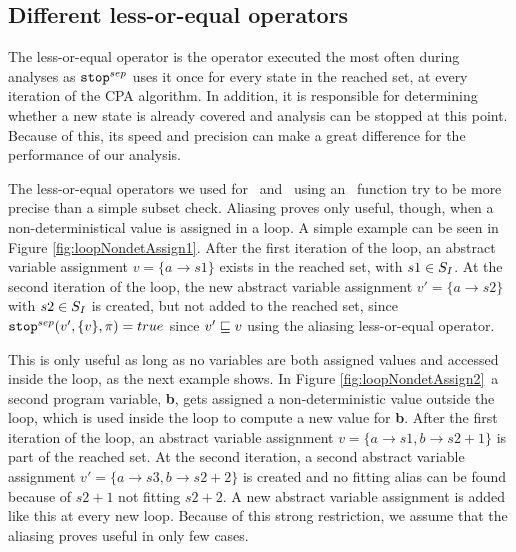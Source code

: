 \subsection{Different less-or-equal operators}
\label{sec:leqOperators}
The less-or-equal operator is the operator executed the most often during analyses as $\texttt{stop}^{sep}$ uses it once for every state in the reached set, at every iteration of the CPA algorithm.
In addition, it is responsible for determining whether a new state is already covered and analysis can be stopped at this point.
Because of this, its speed and precision can make a great difference for the performance of our analysis.

The  less-or-equal operators we used for \symbolicValueAnalysisCPA\ and \constraintsCPA\ using an \aliasFunc\ function try to be more precise than a simple subset check.
Aliasing proves only useful, though, when a non-deterministical value is assigned in a loop. A simple example can be seen in Figure \ref{fig:loopNondetAssign1}.
After the first iteration of the loop, an abstract variable assignment $v = \{ a \rightarrow s1 \}$ exists in the reached set, with $s1 \in S_I$.
At the second iteration of the loop, the new abstract variable assignment $v' = \{ a \rightarrow s2 \}$ with $s2 \in S_I$ is created, but not added to the reached set, since $\texttt{stop}^{sep}(v', \{ v \}, \pi) = true$ since $v' \sqsubseteq v$ using the aliasing less-or-equal operator.

This is only useful as long as no variables are both assigned values and accessed inside the loop, as the next example shows. In Figure \ref{fig:loopNondetAssign2}\ a second program variable, \textbf{b}, gets assigned a non-deterministic value outside the loop, which is used inside the loop to compute a new value for \textbf{b}.
After the first iteration of the loop, an abstract variable assignment $v = \{ a \rightarrow s1, b \rightarrow s2 + 1 \}$ is part of the reached set.
At the second iteration, a second abstract variable assignment $v' = \{ a \rightarrow s3, b \rightarrow s2 + 2 \}$ is created and no fitting alias can be found because of $s2 + 1$ not fitting $s2 + 2$.
A new abstract variable assignment is added like this at every new loop.
Because of this strong restriction, we assume that the aliasing proves useful in only few cases.

